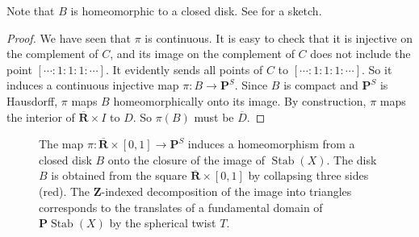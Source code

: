 \documentclass{amsart}
\begin{document}
Note that \(B\) is homeomorphic to a closed disk.
See  for a sketch.
\begin{proof}
  We have seen that \(\pi\) is continuous.
  It is easy to check that it is injective on the complement of \(C\), and its image on the complement of \(C\) does not include the point \([\cdots: 1:1:1: \cdots]\).
  It evidently sends all points of \(C\) to \([\cdots: 1:1:1: \cdots]\).
  So it induces a continuous injective map \(\pi \colon B \to \mathbf{P}^S\).
  Since \(B\) is compact and \(\mathbf{P}^S\) is Hausdorff, \(\pi\) maps \(B\) homeomorphically onto its image.
  By construction, \(\pi\) maps the interior of \(\overline{\mathbf{R}} \times I\) to \(D\).
  So \(\pi(B)\) must be \(\overline D\).
\end{proof}

\begin{figure}[ht]
  \centering
  \caption{The map \(\pi \colon \overline{\mathbf{R}} \times [0,1] \to \mathbf{P}^S\) induces a homeomorphism from a closed disk \(B\) onto the closure of the image of \(\operatorname{Stab}(X)\).
    The disk \(B\) is obtained from the square \(\overline{\mathbf{R}} \times [0,1]\) by collapsing three sides (red).
    The \(\mathbf{Z}\)-indexed decomposition of the image into triangles corresponds to the translates of a fundamental domain of \(\mathbf{P}\operatorname{Stab}(X)\) by the spherical twist \(T\).
  }
  \label{fig:accordion}
\end{figure}
\end{document}
